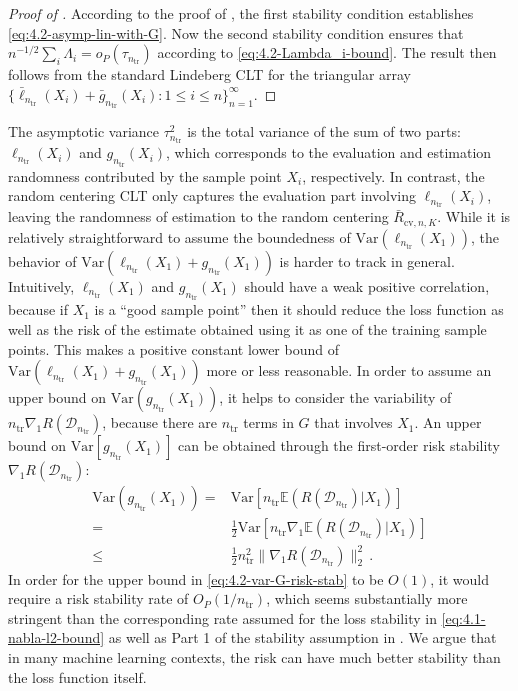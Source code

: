 \documentclass[11pt]{article}
\theoremstyle{plain}
\newcommand{\cv}{{\mathrm{cv}}}
\newcommand{\tr}{{\mathrm{tr}}}
\newcommand{\D}{{\mathcal{D}}}
\newcommand{\var}{\mathrm{Var}}
\begin{document}
\begin{proof}
    [Proof of ]
 According to the proof of ,  the first stability condition establishes \eqref{eq:4.2-asymp-lin-with-G}. Now the second stability condition ensures that $n^{-1/2}\sum_i \Lambda_i=o_P(\tau_{n_\tr})$ according to \eqref{eq:4.2-Lambda_i-bound}.  The result then follows from the standard Lindeberg CLT for the triangular array $\{\bar\ell_{n_\tr}(X_i)+\bar g_{n_\tr}(X_i):1\le i\le n\}_{n=1}^\infty$.
\end{proof}
The asymptotic variance $\tau_{n_\tr}^2$ is the total variance of the sum of two parts: $\ell_{n_\tr}(X_i)$ and $g_{n_\tr}(X_i)$, which corresponds to the evaluation and estimation randomness contributed by the sample point $X_i$, respectively. In contrast, the random centering CLT  only captures the evaluation part involving $\ell_{n_\tr}(X_i)$, leaving the randomness of estimation to the random centering $\bar R_{\cv,n,K}$.  While it is relatively straightforward to assume the boundedness of $\var(\ell_{n_\tr}(X_1))$, the behavior of $\var(\ell_{n_\tr}(X_1)+g_{n_\tr}(X_1))$ is harder to track in general.  Intuitively, $\ell_{n_\tr}(X_1)$ and $g_{n_\tr}(X_1)$ should have a weak positive correlation, because if $X_1$ is a ``good sample point'' then it should reduce the loss function as well as the risk of the estimate obtained using it as one of the training sample points.  This makes a positive constant lower bound of $\var(\ell_{n_\tr}(X_1)+g_{n_\tr}(X_1))$ more or less reasonable.  In order to assume an upper bound on $\var(g_{n_\tr}(X_1))$, it helps to consider the variability of $n_\tr\nabla_1 R(\D_{n_\tr})$, because there are $n_\tr$ terms in $G$ that involves $X_1$.  An upper bound on $\var[g_{n_\tr}(X_1)]$ can be obtained through the first-order risk stability $\nabla_1 R(\D_{n_\tr})$:
\begin{align}
    \label{eq:4.2-var-G-risk-stab}
    \var(g_{n_\tr}(X_1))= &\var\left[n_\tr \mathbb E(R(\D_{n_\tr})|X_1)\right]\nonumber\\
     = &\frac{1}{2}\var\left[n_\tr \nabla_1 \mathbb E(R(\D_{n_\tr})|X_1)\right]\nonumber\\
     \le &\frac{1}{2} n_\tr^2\|\nabla_1 R(\D_{n_\tr})\|_2^2\,.
\end{align}
In order for the upper bound in \eqref{eq:4.2-var-G-risk-stab} to be $O(1)$, it would require a risk stability rate of $O_P(1/n_\tr)$, which seems substantially more stringent than the corresponding rate assumed for the loss stability in \eqref{eq:4.1-nabla-l2-bound} as well as Part 1 of the stability assumption in .   We argue that in many machine learning contexts, the risk can have much better stability than the loss function itself.
\end{document}
